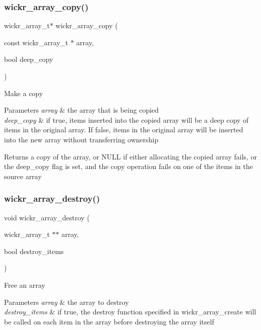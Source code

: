 \subsubsection{\texorpdfstring{wickr\_array\_copy()}{wickr\_array\_copy()}}
{\footnotesize\ttfamily wickr\+\_\+array\+\_\+t$\ast$ wickr\+\_\+array\+\_\+copy (\begin{DoxyParamCaption}\item[{const wickr\+\_\+array\+\_\+t $\ast$}]{array,  }\item[{bool}]{deep\+\_\+copy }\end{DoxyParamCaption})}

Make a copy


\begin{DoxyParams}{Parameters}
{\em array} & the array that is being copied \\
\hline
{\em deep\+\_\+copy} & if true, items inserted into the copied array will be a deep copy of items in the original array. If false, items in the original array will be inserted into the new array without transferring ownership \\
\hline
\end{DoxyParams}
\begin{DoxyReturn}{Returns}
a copy of the array, or N\+U\+LL if either allocating the copied array fails, or the deep\+\_\+copy flag is set, and the copy operation fails on one of the items in the source array 
\end{DoxyReturn}
\mbox{\label{group__wickr__array_ga984338e0a278ef1b23aca7330f0bfcc3}} 
\subsubsection{\texorpdfstring{wickr\_array\_destroy()}{wickr\_array\_destroy()}}
{\footnotesize\ttfamily void wickr\+\_\+array\+\_\+destroy (\begin{DoxyParamCaption}\item[{wickr\+\_\+array\+\_\+t $\ast$$\ast$}]{array,  }\item[{bool}]{destroy\+\_\+items }\end{DoxyParamCaption})}

Free an array


\begin{DoxyParams}{Parameters}
{\em array} & the array to destroy \\
\hline
{\em destroy\+\_\+items} & if true, the destroy function specified in \textquotesingle{}wickr\+\_\+array\+\_\+create\textquotesingle{} will be called on each item in the array before destroying the array itself \\
\hline
\end{DoxyParams}
\mbox{\label{group__wickr__array_ga3a6dd3ee6295f6230e2047584a261774}} 

